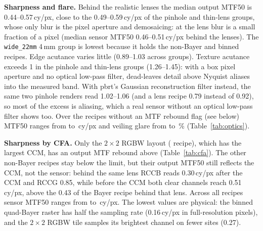 \documentclass[letterpaper,twocolumn,fleqn]{article}
\begin{document}
\textbf{Sharpness and flare.} Behind the realistic lenses the median output MTF50 is 0.44--0.57\,cy/px, close to the 0.49--0.59\,cy/px of the pinhole and thin-lens groups, whose only blur is the pixel aperture and demosaicing: at \scRes{} the lens blur is a small fraction of a pixel (median sensor MTF50 0.46--0.51\,cy/px behind the lenses). The \texttt{wide\_22mm} 4\,mm group is lowest because it holds the non-Bayer and binned recipes. Edge acutance varies little (0.89--1.03 across groups). Texture acutance exceeds 1 in the pinhole and thin-lens groups (1.26--1.45): with a box pixel aperture and no optical low-pass filter, dead-leaves detail above Nyquist aliases into the measured band. With pbrt's Gaussian reconstruction filter instead, the same two pinhole renders read 1.02--1.06 (and a lens recipe 0.79 instead of 0.92), so most of the excess is aliasing, which a real sensor without an optical low-pass filter shows too. Over the recipes without an MTF rebound flag (see below) MTF50 ranges from \mtfMin{} to \mtfMax{}\,cy/px and veiling glare from \glareMin{} to \glareMax\,\% (Table~\ref{tab:optics}).

\begin{table}[t]
\caption{Edge sharpness by CFA (medians): MTF50 of the output luminance (after the CCM), its MTF rebound, and MTF50 and edge acutance of the brightest channel before the CCM.}
\label{tab:cfa}
\vspace{14pt}
\centering\small

\end{table}

\textbf{Sharpness by CFA.} Only the $2\times2$ RGBW layout (\nRebound{} recipe), which has the largest CCM, has an output MTF rebound above \reboundLimit{} (Table~\ref{tab:cfa}). The other non-Bayer recipes stay below the limit, but their output MTF50 still reflects the CCM, not the sensor: behind the same lens RCCB reads 0.30\,cy/px after the CCM and RCCG 0.85, while before the CCM both clear channels reach 0.51\,cy/px, above the 0.43 of the Bayer recipe behind that lens. Across all recipes sensor MTF50 ranges from \mtfSensorMin{} to \mtfSensorMax{}\,cy/px. The lowest values are physical: the binned quad-Bayer raster has half the sampling rate (0.16\,cy/px in full-resolution pixels), and the $2\times2$ RGBW tile samples its brightest channel on fewer sites (0.27).

\begin{table}[t]
\caption{Skin-tone $\Delta E_{00}$ (D65, 12 patches): the four best and four worst recipes.}
\label{tab:skin}
\vspace{14pt}
\centering\small

\end{table}
\end{document}
